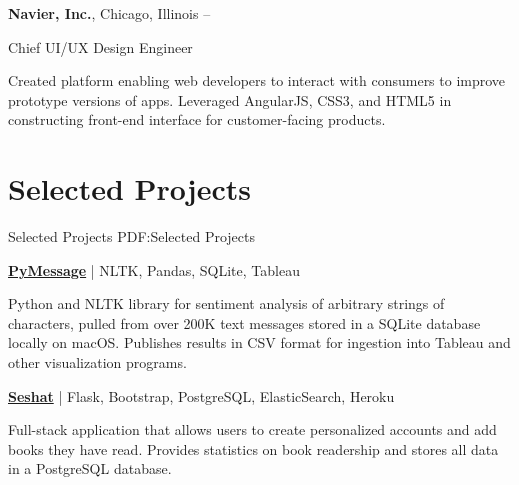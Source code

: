 \documentclass[letterpaper,10pt,oneside]{article}
\begin{document}
\begin{body}
\BigGapNoBreak
{\textbf{Navier, Inc.}},
Chicago, Illinois
\hfill
{} --

\GapNoBreak
\BulletItem
Chief UI/UX Design Engineer
\begin{detail}
\SubBulletItem
Created platform enabling web developers to interact with consumers to improve prototype versions of apps.
\SubBulletItem
Leveraged AngularJS, CSS3, and HTML5 in constructing front-end interface for customer-facing products.
\end{detail}


\noindent\hrulefill
\section
{Selected Projects}
{Selected Projects}
{PDF:Selected Projects}

\href{https://github.com/miloszkowal/PyMessage}
{\textbf{PyMessage}} | NLTK, Pandas, SQLite, Tableau
\hfill

\GapNoBreak
Python and NLTK library for sentiment analysis of arbitrary strings of characters, pulled from over 200K text messages stored in a SQLite database locally on macOS. Publishes results in CSV format for ingestion into Tableau and other visualization programs.

\BigGapNoBreak

\href{https://github.com/miloszkowal/seshat}
{\textbf{Seshat}} | Flask, Bootstrap, PostgreSQL, ElasticSearch, Heroku
\hfill

\GapNoBreak
Full-stack application that allows users to create personalized accounts and add books they have read. Provides statistics on book readership and stores all data in a PostgreSQL database.




\end{body}
\end{document}
